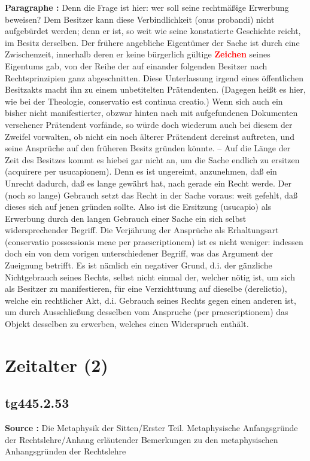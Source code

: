\documentclass[a4paper,12pt,twoside]{book}
\newcommand{\match}[1]{\textcolor{red}{\textbf{#1}}}
\newcommand{\unnumberedsection}[1]{
	\section*{#1}
	\addcontentsline{toc}{section}{#1}
	\markright{#1}
}
\begin{document}
	\textbf{Paragraphe : }Denn die Frage ist hier: wer soll seine rechtmäßige Erwerbung beweisen? Dem Besitzer kann diese Verbindlichkeit (onus probandi) nicht aufgebürdet werden; denn er ist, so weit wie seine konstatierte Geschichte reicht, im Besitz derselben. Der frühere angebliche Eigentümer der Sache ist durch eine Zwischenzeit, innerhalb deren er keine bürgerlich gültige \match{Zeichen} seines Eigentums gab, von der Reihe der auf einander folgenden Besitzer nach Rechtsprinzipien ganz abgeschnitten. Diese Unterlassung irgend eines öffentlichen Besitzakts macht ihn zu einem unbetitelten Prätendenten. (Dagegen heißt es hier, wie bei der Theologie, conservatio est continua creatio.) Wenn sich auch ein bisher nicht manifestierter, obzwar hinten nach mit aufgefundenen Dokumenten versehener Prätendent vorfände, so würde doch wiederum auch bei diesem der Zweifel vorwalten, ob nicht ein noch älterer Prätendent dereinst auftreten, und seine Ansprüche auf den früheren Besitz gründen könnte. – Auf die Länge der Zeit des Besitzes kommt es hiebei gar nicht an, um die Sache endlich zu ersitzen (acquirere per usucapionem). Denn es ist ungereimt, anzunehmen, daß ein Unrecht dadurch, daß es lange gewährt hat, nach gerade ein Recht werde. Der (noch so lange) Gebrauch setzt das Recht in der Sache voraus: weit gefehlt, daß dieses sich auf jenen gründen sollte. Also ist die Ersitzung (usucapio) als Erwerbung durch den langen Gebrauch einer Sache ein sich selbst widersprechender Begriff. Die Verjährung der Ansprüche als Erhaltungsart (conservatio possessionis meae per praescriptionem) ist es nicht weniger: indessen doch ein von dem vorigen unterschiedener Begriff, was das Argument der Zueignung betrifft. Es ist nämlich ein negativer Grund, d.i. der gänzliche Nichtgebrauch seines Rechts, selbst nicht einmal der, welcher nötig ist, um sich als Besitzer zu manifestieren, für eine Verzichttuung auf dieselbe (derelictio), welche ein rechtlicher Akt, d.i. Gebrauch seines Rechts gegen einen  anderen ist, um durch Ausschließung desselben vom Anspruche (per praescriptionem) das Objekt desselben zu erwerben, welches einen Widerspruch enthält. 
	
	\unnumberedsection{Zeitalter (2)} 
	\subsection*{tg445.2.53} 
	\textbf{Source : }Die Metaphysik der Sitten/Erster Teil. Metaphysische Anfangsgründe der Rechtslehre/Anhang erläutender Bemerkungen zu den metaphysischen Anhangsgründen der Rechtslehre\\  
	
\end{document}
